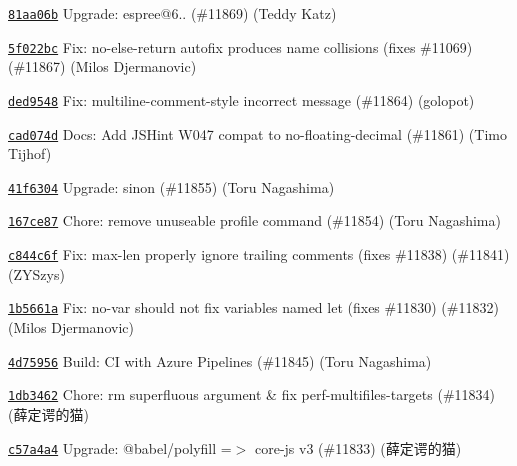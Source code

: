 \begin{DoxyItemize}
\item \href{https://github.com/eslint/eslint/commit/81aa06b4cc49e9c15234a2c4d27659a03fea53d8}{\texttt{ {\ttfamily 81aa06b}}} Upgrade\+: espree@6.. (\#11869) (Teddy Katz)
\item \href{https://github.com/eslint/eslint/commit/5f022bc91d0d93d140876ceb1ee4e08b1b7cfd49}{\texttt{ {\ttfamily 5f022bc}}} Fix\+: no-\/else-\/return autofix produces name collisions (fixes \#11069) (\#11867) (Milos Djermanovic)
\item \href{https://github.com/eslint/eslint/commit/ded9548d881b15e771ca79b844e8159601f30f70}{\texttt{ {\ttfamily ded9548}}} Fix\+: multiline-\/comment-\/style incorrect message (\#11864) (golopot)
\item \href{https://github.com/eslint/eslint/commit/cad074d4ddb34a59183b5965ca50170713b5a711}{\texttt{ {\ttfamily cad074d}}} Docs\+: Add JSHint W047 compat to no-\/floating-\/decimal (\#11861) (Timo Tijhof)
\item \href{https://github.com/eslint/eslint/commit/41f6304ce641a82ee729251b448dceb9fb0d501d}{\texttt{ {\ttfamily 41f6304}}} Upgrade\+: sinon (\#11855) (Toru Nagashima)
\item \href{https://github.com/eslint/eslint/commit/167ce87e908ec04b0d3d79960278d45c883c4285}{\texttt{ {\ttfamily 167ce87}}} Chore\+: remove unuseable profile command (\#11854) (Toru Nagashima)
\item \href{https://github.com/eslint/eslint/commit/c844c6f2ff314cfa8c6ca0e35a1ef58b7e297b79}{\texttt{ {\ttfamily c844c6f}}} Fix\+: max-\/len properly ignore trailing comments (fixes \#11838) (\#11841) (ZYSzys)
\item \href{https://github.com/eslint/eslint/commit/1b5661ae467c227c0239e06cc1466480004aa799}{\texttt{ {\ttfamily 1b5661a}}} Fix\+: no-\/var should not fix variables named \textquotesingle{}let\textquotesingle{} (fixes \#11830) (\#11832) (Milos Djermanovic)
\item \href{https://github.com/eslint/eslint/commit/4d75956147b6fd662ee90eb21d3f762816463b88}{\texttt{ {\ttfamily 4d75956}}} Build\+: CI with Azure Pipelines (\#11845) (Toru Nagashima)
\item \href{https://github.com/eslint/eslint/commit/1db346220889305a427b45a00afcf362b81b3767}{\texttt{ {\ttfamily 1db3462}}} Chore\+: rm superfluous argument \& fix perf-\/multifiles-\/targets (\#11834) (薛定谔的猫)
\item \href{https://github.com/eslint/eslint/commit/c57a4a4a993193c4208c6419df331a7bc644a536}{\texttt{ {\ttfamily c57a4a4}}} Upgrade\+: @babel/polyfill =\texorpdfstring{$>$}{>} core-\/js v3 (\#11833) (薛定谔的猫)

\end{DoxyItemize}
